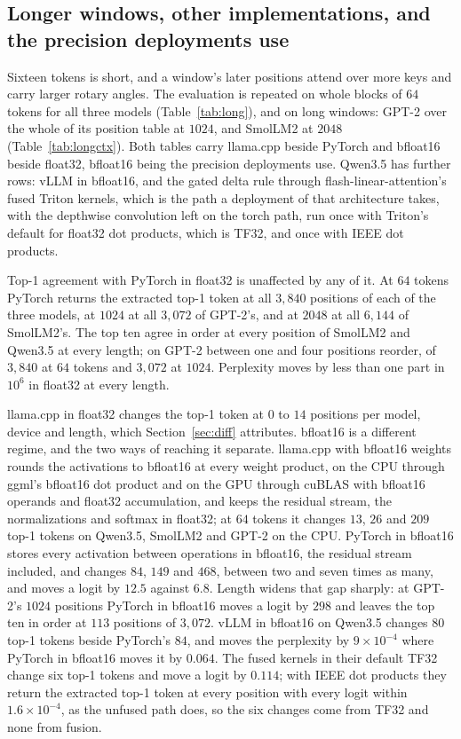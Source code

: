 \documentclass[11pt]{article}
\theoremstyle{plain}
\theoremstyle{definition}
\begin{document}
\subsection{Longer windows, other implementations, and the precision deployments use}
\label{sec:longer}

Sixteen tokens is short, and a window's later positions attend over more keys
and carry larger rotary angles. The evaluation is repeated on whole blocks of
$64$ tokens for all three models (Table~\ref{tab:long}), and on long windows:
GPT-2 over the whole of its position table at $1024$, and SmolLM2 at $2048$
(Table~\ref{tab:longctx}). Both tables carry llama.cpp beside PyTorch
and bfloat16 beside float32, bfloat16 being the precision deployments use.
Qwen3.5 has further rows: vLLM in bfloat16, and the gated delta rule through
flash-linear-attention's fused Triton kernels, which is the path a deployment
of that architecture takes, with the depthwise convolution left on the torch
path, run once with Triton's default for float32 dot products, which is TF32,
and once with IEEE dot products.

Top-1 agreement with PyTorch in float32 is unaffected by any of it. At $64$
tokens PyTorch returns the extracted top-1 token at all $3{,}840$ positions of
each of the three models, at $1024$ at all $3{,}072$ of GPT-2's, and at $2048$
at all $6{,}144$ of SmolLM2's. The top ten agree in order at every position of
SmolLM2 and Qwen3.5 at every length; on GPT-2 between one and four positions
reorder, of $3{,}840$ at $64$ tokens and $3{,}072$ at $1024$. Perplexity moves
by less than one part in $10^{6}$ in float32 at every length.

llama.cpp in float32 changes the top-1 token at $0$ to $14$ positions per model,
device and length, which Section~\ref{sec:diff} attributes. bfloat16 is a
different regime, and the two ways of reaching it separate. llama.cpp with
bfloat16 weights rounds the activations to bfloat16 at every weight product, on
the CPU through ggml's bfloat16 dot product and on the GPU through cuBLAS with
bfloat16 operands and float32 accumulation, and keeps the residual stream, the
normalizations and softmax in float32; at $64$ tokens it changes $13$, $26$ and
$209$ top-1 tokens on Qwen3.5, SmolLM2 and GPT-2 on the CPU. PyTorch in
bfloat16 stores every activation between operations in bfloat16, the residual
stream included, and changes $84$,
$149$ and $468$, between two and seven times as many, and moves a logit by
$12.5$ against $6.8$. Length
widens that gap sharply: at GPT-2's $1024$ positions PyTorch in bfloat16 moves
a logit by $298$ and leaves the top ten in order at $113$ positions of
$3{,}072$. vLLM in bfloat16 on Qwen3.5 changes $80$ top-1 tokens beside
PyTorch's $84$, and moves the perplexity by $9\times10^{-4}$ where PyTorch in
bfloat16 moves it by $0.064$. The fused kernels in their default TF32 change
six top-1 tokens and move a logit by $0.114$; with IEEE dot products they return
the extracted top-1 token at every position with every logit within
$1.6\times10^{-4}$, as the unfused path does, so the six changes come from TF32
and none from fusion.
\end{document}
